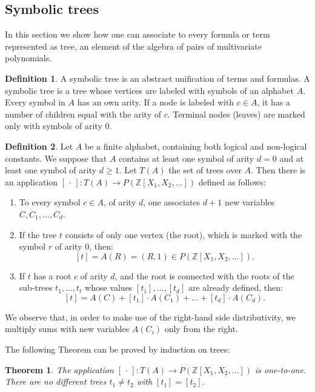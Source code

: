 \documentclass{article}
\theoremstyle{plain}
\newtheorem{theorem}{Theorem}[section]
\theoremstyle{definition}
\newtheorem{definition}{Definition}[section]
\begin{document}
\subsection{Symbolic trees} 

In this section we show how one can associate to every formula or term represented as tree, an element of the algebra of pairs of multivariate polynomials. 

\begin{definition}\label{defsymbolictrees}
    A symbolic tree is an abstract unification of terms and formulas. A symbolic tree is a tree whose vertices are labeled with symbols of an alphabet $A$. Every symbol in $A$ has an own arity. If a node is labeled with $c \in A$, it has a number of children equal with the arity of $c$. Terminal nodes (leaves) are marked only with symbols of arity $0$. 
\end{definition} 

\begin{definition}\label{defembedding}
Let $A$ be a finite alphabet, containing both logical and non-logical constants. We suppose that $A$ contains at least one symbol of arity $d = 0$ and at least one symbol of arity $d \geq 1$. Let $T(A)$ the set of trees over $A$. Then there is an application $[\,\cdot \,] : T(A) \rightarrow P(\mathbb Z[X_1, X_2, \dots])$ defined as follows:
\begin{enumerate}
    \item To every symbol $c \in A$, of arity $d$, one associates $d+1$ new variables $C, C_1, \dots, C_d$. 
    \item If the tree $t$ consists of only one vertex (the root), which is marked with the symbol $r$ of arity $0$, then:
    $$[t] = A(R) = (R, 1) \in P(\mathbb Z[X_1, X_2, \dots]).$$
    \item If $t$ has a root $c$ of arity $d$, and the root is connected with the roots of the sub-trees $t_1, \dots, t_t$ whose values $[t_1], \dots, [t_d]$ are already defined, then:
    $$[t] = A(C) + [t_1] \cdot A(C_1) + \dots + [t_d] \cdot A(C_d).$$
\end{enumerate}
\end{definition}
We observe that, in order to make use of the right-hand side distributivity, we multiply sums with new variables $A(C_i)$ only from the right. 

The following Theorem can be proved by induction on trees:

\begin{theorem}\label{theopairsunicity}
    The application $[\,\cdot \,] : T(A) \rightarrow P(\mathbb Z[X_1, X_2, \dots])$ is one-to-one. There are no different trees $t_1 \neq t_2$ with $[t_1] = [t_2]$. 
\end{theorem} 
\end{document}

